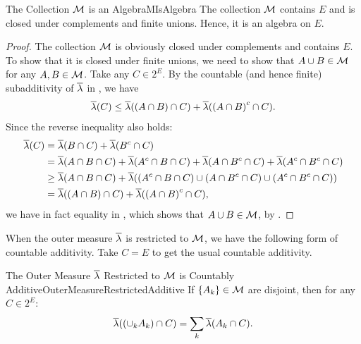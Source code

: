 \begin{lem}{The Collection \(\mathcal{M}\) is an Algebra}{MIsAlgebra}
	The collection \(\mathcal{M}\) contains \(E\) and is closed under complements and finite unions. Hence, it is an algebra on \(E\).
\end{lem}

\begin{proof}
	The collection \(\mathcal{M}\) is obviously closed under complements and contains \(E\). To show that it is closed under finite unions, we need to show that \(A \cup B \in \mathcal{M}\) for any \(A, B \in \mathcal{M}\). Take any \(C \in 2^E\). By the countable (and hence finite) subadditivity of \(\overline{\lambda}\) in , we have
	\begin{equation}
		\overline{\lambda}(C) \le \overline{\lambda}((A \cap B) \cap C) + \overline{\lambda}({(A \cap B)}^c \cap C).
		\label{eq:AlgebraInequality}
	\end{equation}
	Since the reverse inequality also holds:
	\begin{align*}
		\overline{\lambda}(C) & = \overline{\lambda}(B \cap C) + \overline{\lambda}(B^c \cap C)                                                                                         \\
		                  & = \overline{\lambda}(A \cap B \cap C) + \overline{\lambda}(A^c \cap B \cap C) + \overline{\lambda}(A \cap B^c \cap C) + \overline{\lambda}(A^c \cap B^c \cap C) \\
		                  & \ge \overline{\lambda}(A \cap B \cap C) + \overline{\lambda}((A^c \cap B \cap C) \cup (A \cap B^c \cap C) \cup (A^c \cap B^c \cap C))                   \\
		                  & = \overline{\lambda}((A \cap B) \cap C) + \overline{\lambda}({(A \cap B)}^c \cap C),
	\end{align*}
	we have in fact equality in , which shows that \(A \cup B \in \mathcal{M}\), by .
\end{proof}

When the outer measure \(\overline{\lambda}\) is restricted to \(\mathcal{M}\), we have the following form of countable additivity. Take \(C=E\) to get the usual countable additivity.

\begin{lem}{The Outer Measure \(\overline{\lambda}\) Restricted to \(\mathcal{M}\) is Countably Additive}{OuterMeasureRestrictedAdditive}
	If \(\{A_k\} \in \mathcal{M}\) are disjoint, then for any \(C \in 2^E\):
	\begin{equation}
		\overline{\lambda}((\cup_k A_k) \cap C) = \sum_k \overline{\lambda}(A_k \cap C).
		\label{eq:RestrictedAdditivity}
	\end{equation}
\end{lem}

